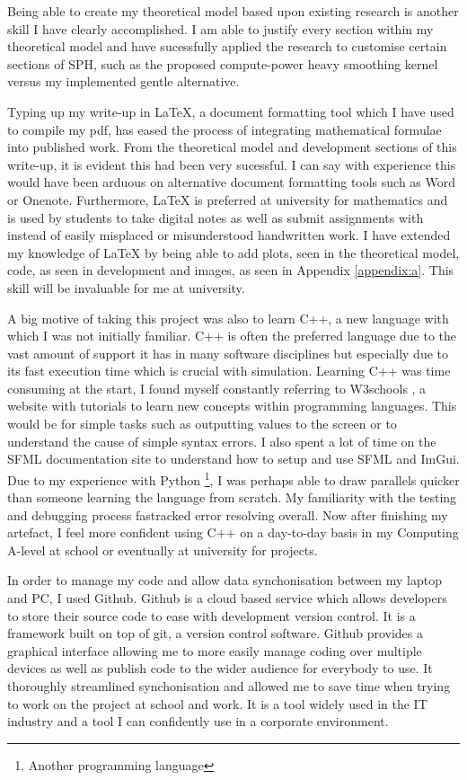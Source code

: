 \documentclass[write-up.tex]{subfiles}
\begin{document}
Being able to create my theoretical model based upon existing research is another skill I have clearly accomplished. I am able to justify every section within my theoretical model and have sucessfully applied the research to customise certain sections of SPH, such as the proposed compute-power heavy smoothing kernel versus my implemented gentle alternative.

Typing up my write-up in LaTeX, a document formatting tool which I have used to compile my pdf, has eased the process of integrating mathematical formulae into published work. From the theoretical model and development sections of this write-up, it is evident this had been very sucessful. I can say with experience this would have been arduous on alternative document formatting tools such as Word or Onenote. Furthermore, LaTeX is preferred at university for mathematics and is used by students to take digital notes as well as submit assignments with instead of easily misplaced or misunderstood handwritten work. I have extended my knowledge of LaTeX by being able to add plots, seen in the theoretical model, code, as seen in development and images, as seen in Appendix \ref{appendix:a}. This skill will be invaluable for me at university.

A big motive of taking this project was also to learn C++, a new language with which I was not initially familiar. C++ is often the preferred language due to the vast amount of support it has in many software disciplines but especially due to its fast execution time which is crucial with simulation. Learning C++ was time consuming at the start, I found myself constantly referring to W3schools \cite{W3schools},  a website with tutorials to learn new concepts within programming languages. This would be for simple tasks such as outputting values to the screen or to understand the cause of simple syntax errors. I also spent a lot of time on the SFML documentation site \cite{SFML} to understand how to setup and use SFML and ImGui. Due to my experience with Python \footnote{Another programming language}, I was perhaps able to draw parallels quicker than someone learning the language from scratch. My familiarity with the testing and debugging process fastracked error resolving overall. Now after finishing my artefact, I feel more confident using C++ on a day-to-day basis in my Computing A-level at school or eventually at university for projects.

In order to manage my code and allow data synchonisation between my laptop and PC, I used Github. Github is a cloud based service which allows developers to store their source code to ease with development version control. It is a framework built on top of git, a version control software. Github provides a graphical interface allowing me to more easily manage coding over multiple devices as well as publish code to the wider audience for everybody to use. It thoroughly streamlined synchonisation and allowed me to save time when trying to work on the project at school and work. It is a tool widely used in the IT industry and a tool I can confidently use in a corporate environment.
\end{document}
